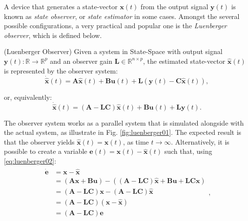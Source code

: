 \documentclass[a4paper,11pt]{book}
\numberwithin{figure}{chapter}
\numberwithin{equation}{chapter}
\numberwithin{table}{chapter}
\theoremstyle{definition}
\newtheorem{definition}{Definition}[chapter]
\newcounter{boxed-theorem}
\newcounter{boxed-definition}
\newenvironment{boxed-definition}[1]
{\colorlet{shadecolor}{pastelYellow!15} \begin{shaded} \begin{definition}{#1}}
{\end{definition} \end{shaded}}
\newcounter{boxed-example}
\begin{document}
A device that generates a state-vector $\bm{x}(t)$ from the output signal $\bm{y}(t)$ is known as \textit{state observer}, or \textit{state estimator} in some cases. Amongst the several possible configurations, a very practical and popular one is the \textit{Luenberger observer}, which is defined below.

\begin{boxed-definition}{(Luenberger Observer)} \label{def:luenberger}
    Given a system in State-Space with output signal $\bm{y}(t) : \mathbb{R} \rightarrow \mathbb{R}^p$ and an observer gain $\bm{L} \in \mathbb{R}^{n \times p}$, the estimated state-vector $\hat{\bm{x}}(t)$ is represented by the observer system:
    \begin{equation}
        \dot{\hat{\bm{x}}}(t) = \bm{A} \hat{\bm{x}}(t) + \bm{B} \bm{u}(t) + \bm{L} \left( \bm{y}(t) - \bm{C} \hat{\bm{x}}(t) \right)
    ,\end{equation}
    
    \noindent or, equivalently:
    \begin{equation} \label{eq:luenberger02}
        \dot{\hat{\bm{x}}}(t) = \left( \bm{A} - \bm{L} \bm{C} \right) \hat{\bm{x}}(t) + \bm{B} \bm{u}(t) + \bm{L} \bm{y}(t)
    .\end{equation}
\end{boxed-definition}

The observer system works as a parallel system that is simulated alongside with the actual system, as illustrate in Fig. \ref{fig:luenberger01}. The expected result is that the observer yields $\hat{\bm{x}}(t) = \bm{x}(t)$, as time $t \to \infty$. Alternatively, it is possible to create a variable $\bm{e}(t) = \bm{x}(t) - \hat{\bm{x}}(t)$ such that, using \eqref{eq:luenberger02}:
\begin{align}
\begin{split}
    \dot{\bm{e}} &= \bm{x} - \hat{\bm{x}} \\ 
        &= \left( \bm{A} \bm{x} + \bm{B} \bm{u} \right) - \left( \left( \bm{A} - \bm{L} \bm{C} \right) \hat{\bm{x}} + \bm{B} \bm{u} + \bm{L} \bm{C} \bm{x} \right) \\
        &= \left( \bm{A} - \bm{L} \bm{C} \right) \bm{x} - \left( \bm{A} - \bm{L} \bm{C} \right) \hat{\bm{x}} \\
        &= \left( \bm{A} - \bm{L} \bm{C} \right) \left( \bm{x} - \hat{\bm{x}} \right) \\
        &= \left( \bm{A} - \bm{L} \bm{C} \right) \bm{e}
\end{split}
,\end{align}
\end{document}
